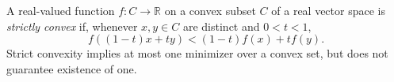 
A real-valued function $f:C\to\mathbb R$ on a convex subset $C$ of a real vector space is \emph{strictly convex} if, whenever $x,y\in C$ are distinct and $0<t<1$,
\[
f((1-t)x+ty)<(1-t)f(x)+tf(y).
\]
Strict convexity implies at most one minimizer over a convex set, but does not guarantee existence of one.
